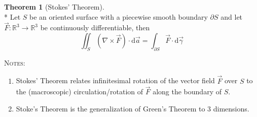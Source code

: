 \documentclass[10pt,a4paper]{report}
\theoremstyle{definition}
\newtheorem{theorem}{Theorem}[chapter]
\theoremstyle{plain}
\theoremstyle{definition}
\theoremstyle{plain}
\newcommand{\ddns}{\mathrm{d}}
\newenvironment{notes}{\par\begin{tcolorbox}\textsc{Notes:}\begin{enumerate}[1)]}{\end{enumerate}\end{tcolorbox}}
\newcommand{\real}{\mathbb{R}}
\newcommand{\curl}[1]{\nabla\!\times\!#1}
\begin{document}
\begin{theorem}[Stokes' Theorem]\label{thm:1-2}\ \\*
    Let $S$ be an oriented surface with a piecewise smooth boundary $\partial S$ and let $\vec{F}\colon \real^3\to\real^3$ be continuously
    differentiable, then
    \[
        \iint_S \left( \curl{\vec{F}} \right) \cdot \ddns\vec{a} = \int_{\partial S}\vec{F}\cdot\ddns\vec{\gamma}
    \]

    \begin{notes}
        \item
            Stokes' Theorem relates infinitesimal rotation of the vector field $\vec{F}$ over $S$ to the (macroscopic) circulation/rotation
            of $\vec{F}$ along the boundary of $S$.
        \item
            Stoke's Theorem is the generalization of Green's Theorem to 3 dimensions.
    \end{notes}
\end{theorem}
\end{document}

